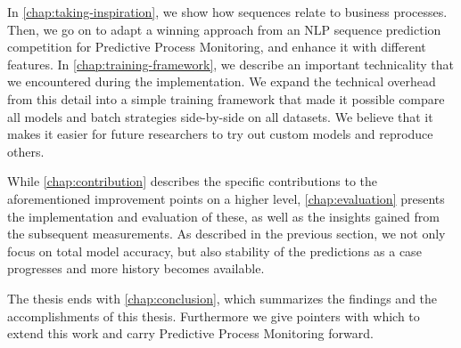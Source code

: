 In \autoref{chap:taking-inspiration}, we show how sequences relate to business processes. Then, we go on to adapt a winning approach from an NLP sequence prediction competition for Predictive Process Monitoring, and enhance it with different features. In \autoref{chap:training-framework}, we describe an important technicality that we encountered during the implementation. We expand the technical overhead from this detail into a simple training framework that made it possible compare all models and batch strategies side-by-side on all datasets. We believe that it makes it easier for future researchers to try out custom models and reproduce others.

While \autoref{chap:contribution} describes the specific contributions to the aforementioned improvement points on a higher level, \autoref{chap:evaluation} presents the implementation and evaluation of these, as well as the insights gained from the subsequent measurements. As described in the previous section, we not only focus on total model accuracy, but also stability of the predictions as a case progresses and more history becomes available.

The thesis ends with \autoref{chap:conclusion}, which summarizes the findings and the accomplishments of this thesis. Furthermore we give pointers with which to extend this work and carry Predictive Process Monitoring forward.